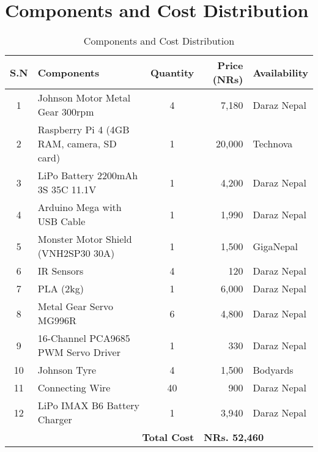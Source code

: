 \section*{Components and Cost Distribution}

\begin{table}[h]
\centering
\begin{tabular}{|c|l|c|r|l|}
\hline
\textbf{S.N} & \textbf{Components} & \textbf{Quantity} & \textbf{Price (NRs)} & \textbf{Availability} \\
\hline
1  & Johnson Motor Metal Gear 300rpm                 & 4  & 7,180  & Daraz Nepal \\
\hline
2  & Raspberry Pi 4 (4GB RAM, camera, SD card)       & 1  & 20,000 & Technova \\
\hline
3  & LiPo Battery 2200mAh 3S 35C 11.1V               & 1  & 4,200  & Daraz Nepal \\
\hline
4  & Arduino Mega with USB Cable                     & 1  & 1,990  & Daraz Nepal \\
\hline
5  & Monster Motor Shield (VNH2SP30 30A)             & 1  & 1,500  & GigaNepal \\
\hline
6  & IR Sensors                                       & 4  & 120    & Daraz Nepal \\
\hline
7  & PLA (2kg)                                        & 1  & 6,000  & Daraz Nepal \\
\hline
8  & Metal Gear Servo MG996R                         & 6  & 4,800  & Daraz Nepal \\
\hline
9  & 16-Channel PCA9685 PWM Servo Driver             & 1  & 330    & Daraz Nepal \\
\hline
10 & Johnson Tyre                                     & 4  & 1,500  & Bodyards \\
\hline
11 & Connecting Wire                                  & 40 & 900    & Daraz Nepal \\
\hline
12 & LiPo IMAX B6 Battery Charger                    & 1  & 3,940  & Daraz Nepal \\
\hline
\multicolumn{3}{|r|}{\textbf{Total Cost}} & \multicolumn{2}{l|}{\textbf{NRs. 52,460}} \\
\hline
\end{tabular}
\caption{Components and Cost Distribution}
\end{table}
